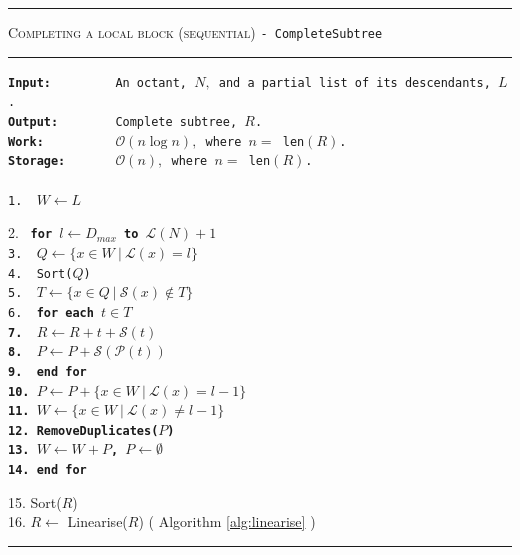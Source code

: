 \begin{table} 
\centering
\rule{\textwidth}{0.01mm}
\begin{algorithm}{ \textsc{Completing a local block (sequential)} \tt{- CompleteSubtree} }
\rule{\textwidth}{0.01mm}
\flushleft
\tt{\bf{Input:~~~~~~~~}} An octant, $N,$ and a partial list of its descendants, $L$.\\
\tt{\bf{Output:~~~~~~~}} Complete subtree, $R$.\\
\tt{\bf{Work:~~~~~~~~~}} $\mathcal{O}(n\log n),$ where $n = $ len$(R)$.\\
\tt{\bf{Storage:~~~~~~}} $\mathcal{O}(n),$ where $n = $ len$(R)$.\\
~\\
1.~ \tt{$W \leftarrow L$}\\
\begin{tabbing}
2.~ \tt{\bf for} \= \tt{$l \leftarrow D_{max}$ \bf{to} $\mathcal{L}(N)+1$}\\
3.~ \> \tt{$Q \leftarrow \{x \in W ~|~ \mathcal{L}(x) = l\}$}\\       
4.~ \> \tt{Sort($Q$)}\\ 
5.~ \> \tt{$T \leftarrow \{x \in Q ~|~ \mathcal{S}(x) \notin T\}$}\\      
6.~ \> \tt{\bf for} \=\bf{each} {$t \in T$}\\
7.~ \> \> $R \leftarrow R + t + \mathcal{S}(t)$\\
8.~ \> \> $P \leftarrow P + \mathcal{S}\left(\mathcal{P}(t)\right)$\\
9.~ \> \tt{\bf end for}\\
10. \> $P \leftarrow P + \{x \in W ~|~ \mathcal{L}(x) = l-1\}$ \\ 		
11. \> $W \leftarrow \{x \in W ~|~ \mathcal{L}(x) \neq l-1\}$ \\
12.	\> \tt{RemoveDuplicates($P$)}\\
13. \> $W \leftarrow W + P$,  $P \leftarrow \emptyset$\\
14. \tt{\bf end for}
\end{tabbing}
15. Sort($R$)\\
16. $R \leftarrow$ Linearise($R$) ( Algorithm \ref{alg:linearise} )\\ 
\label{alg:conComp}
\end{algorithm}
\rule{\textwidth}{0.01mm}
\end{table}

